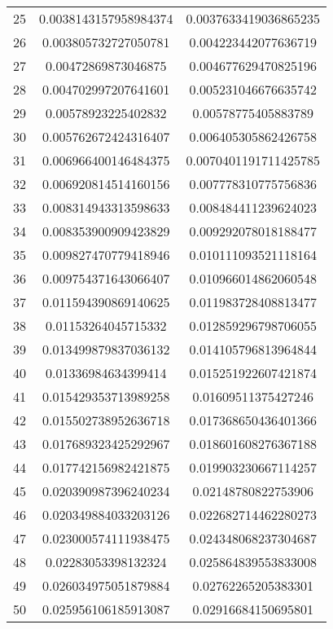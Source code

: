 \documentclass[11pt]{scrartcl}
\theoremstyle{dotlessP}
\theoremstyle{dotlessN}
\theoremstyle{dotN}
\begin{document}
\begin{tabular}{c|c|c}
25 & 0.0038143157958984374 & 0.0037633419036865235 \\
26 & 0.003805732727050781 & 0.004223442077636719 \\
27 & 0.00472869873046875 & 0.004677629470825196 \\
28 & 0.004702997207641601 & 0.005231046676635742 \\
29 & 0.00578923225402832 & 0.00578775405883789 \\
30 & 0.005762672424316407 & 0.006405305862426758 \\
31 & 0.006966400146484375 & 0.0070401191711425785 \\
32 & 0.006920814514160156 & 0.007778310775756836 \\
33 & 0.008314943313598633 & 0.008484411239624023 \\
34 & 0.008353900909423829 & 0.009292078018188477 \\
35 & 0.009827470779418946 & 0.010111093521118164 \\
36 & 0.009754371643066407 & 0.010966014862060548 \\
37 & 0.011594390869140625 & 0.011983728408813477 \\
38 & 0.01153264045715332 & 0.012859296798706055 \\
39 & 0.013499879837036132 & 0.014105796813964844 \\
40 & 0.01336984634399414 & 0.015251922607421874 \\
41 & 0.015429353713989258 & 0.01609511375427246 \\
42 & 0.015502738952636718 & 0.017368650436401366 \\
43 & 0.017689323425292967 & 0.018601608276367188 \\
44 & 0.017742156982421875 & 0.019903230667114257 \\
45 & 0.020390987396240234 & 0.02148780822753906 \\
46 & 0.020349884033203126 & 0.022682714462280273 \\
47 & 0.023000574111938475 & 0.024348068237304687 \\
48 & 0.02283053398132324 & 0.025864839553833008 \\
49 & 0.026034975051879884 & 0.02762265205383301 \\
50 & 0.025956106185913087 & 0.02916684150695801 \\
\end{tabular}
\end{document}
